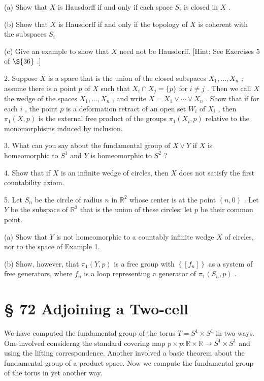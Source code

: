 (a) Show that \(X\) is Hausdorff if and only if each space \({S}_{i}\) is closed in \(X\) .

(b) Show that \(X\) is Hausdorff if and only if the topology of \(X\) is coherent with the subspaces \({S}_{i}\)

(c) Give an example to show that \(X\) need not be Hausdorff. [Hint: See Exercises 5 of \( \S {36}\) .]

2. Suppose \(X\) is a space that is the union of the closed subspaces \({X}_{1},\ldots ,{X}_{n}\) ; assume there is a point \(p\) of \(X\) such that \({X}_{i} \cap  {X}_{j} = \{ p\}\) for \(i \neq  j\) . Then we call \(X\) the wedge of the spaces \({X}_{1},\ldots ,{X}_{n}\) , and write \(X = {X}_{1} \vee  \cdots  \vee  {X}_{n}\) . Show that if for each \(i\) , the point \(p\) is a deformation retract of an open set \({W}_{i}\) of \({X}_{i}\) , then \({\pi }_{1}\left( {X,p}\right)\) is the external free product of the groups \({\pi }_{1}\left( {{X}_{i},p}\right)\) relative to the monomorphisms induced by inclusion.

3. What can you say about the fundamental group of \(X \vee  Y\) if \(X\) is homeomorphic to \({S}^{1}\) and \(Y\) is homeomorphic to \({S}^{2}\) ?

4. Show that if \(X\) is an infinite wedge of circles, then \(X\) does not satisfy the first countability axiom.

5. Let \({S}_{n}\) be the circle of radius \(n\) in \({\mathbb{R}}^{2}\) whose center is at the point \(\left( {n,0}\right)\) . Let \(Y\) be the subspace of \({\mathbb{R}}^{2}\) that is the union of these circles; let \(p\) be their common point.

(a) Show that \(Y\) is not homeomorphic to a countably infinite wedge \(X\) of circles, nor to the space of Example 1.

(b) Show, however, that \({\pi }_{1}\left( {Y,p}\right)\) is a free group with \(\left\{  \left\lbrack  {f}_{n}\right\rbrack  \right\}\) as a system of free generators, where \({f}_{n}\) is a loop representing a generator of \({\pi }_{1}\left( {{S}_{n},p}\right)\) .

\section*{§ 72 Adjoining a Two-cell}

We have computed the fundamental group of the torus \(T = {S}^{1} \times  {S}^{1}\) in two ways. One involved considerng the standard covering map \(p \times  p : \mathbb{R} \times  \mathbb{R} \rightarrow  {S}^{1} \times  {S}^{1}\) and using the lifting correspondence. Another involved a basic theorem about the fundamental group of a product space. Now we compute the fundamental group of the torus in yet another way.


